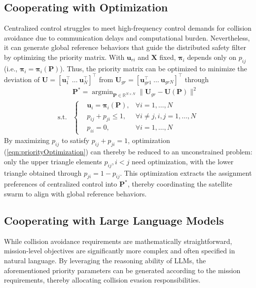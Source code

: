 \documentclass{ifacconf}
\begin{document}
\subsection{Cooperating with Optimization}
\par Centralized control struggles to meet high-frequency control demands for collision avoidance due to communication delays and computational burden.
Nevertheless, it can generate global reference behaviors that guide the distributed safety filter by optimizing the priority matrix.
With $\boldsymbol{u}_{ri}$ and $\boldsymbol{X}$ fixed, $\boldsymbol{\pi}_i$ depends only on $p_{ij}$ (i.e., $\boldsymbol{\pi}_i = \boldsymbol{\pi}_i (\boldsymbol{P})$). Thus, the priority matrix can be optimized to minimize the deviation of $\boldsymbol{U} = [\boldsymbol{u}_1^\top~\dots~\boldsymbol{u}_N^\top]^\top$ from $\boldsymbol{U}_{gr} = [\boldsymbol{u}_{gr1}^{\top}~\dots~\boldsymbol{u}_{grN}]^\top$ through
\begin{equation}\label{eqn:priorityOptimization}
\begin{aligned}
      & \boldsymbol{P}^{\ast} = \mathop{\arg \min}_{\boldsymbol{P} \in \mathbb{R}^{N\times N}} \| \boldsymbol{U}_{gr} - \boldsymbol{U}(\boldsymbol{P}) \|^2 \\
      \mathrm{s.t.}& \left\{ 
         \begin{aligned}
            &\boldsymbol{u}_i =  \boldsymbol{\pi}_i(\boldsymbol{P}), &\forall i = 1, \dots, N\\
            &p_{ij} + p_{ji} \le 1, &\forall i \neq j, i, j = 1, \dots, N\\
            &p_{ii} = 0, &\forall i = 1, \dots, N
         \end{aligned}   
      \right.
\end{aligned}
\end{equation}
By maximizing $p_{ij}$ to satisfy $p_{ij} + p_{ji} = 1$, optimization (\ref{eqn:priorityOptimization}) can thereby be reduced to an unconstrained problem: only the upper triangle elements $p_{ij}, i < j$ need optimization, with the lower triangle obtained through $p_{ji} = 1 - p_{ij}$.
This optimization extracts the assignment preferences of centralized control into $\boldsymbol{P}^{\ast}$, thereby coordinating the satellite swarm to align with global reference behaviors.

\subsection{Cooperating with Large Language Models}
\par While collision avoidance requirements are mathematically straightforward, mission-level objectives are significantly more complex and often specified in natural language. 
By leveraging the reasoning ability of LLMs, the aforementioned priority parameters can be generated according to the mission requirements, thereby allocating collision evasion responsibilities.
\end{document}
